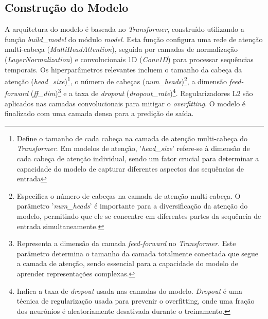 \subsection{Construção do Modelo}
A arquitetura do modelo é baseada no \textit{Transformer}, construído utilizando a função \textit{build\_model} do módulo \textit{model}. Esta função configura uma rede de atenção multi-cabeça (\textit{MultiHeadAttention}), seguida por camadas de normalização (\textit{LayerNormalization}) e convolucionais 1D (\textit{Conv1D}) para processar sequências temporais. Os hiperparâmetros relevantes incluem o tamanho da cabeça da atenção (\textit{head\_size})\footnote{Define o tamanho de cada cabeça na camada de atenção multi-cabeça do \textit{Transformer}. Em modelos de atenção, '\textit{head\_size}' refere-se à dimensão de cada cabeça de atenção individual, sendo um fator crucial para determinar a capacidade do modelo de capturar diferentes aspectos das sequências de entrada}, o número de cabeças (\textit{num\_heads})\footnote{Especifica o número de cabeças na camada de atenção multi-cabeça. O parâmetro '\textit{num\_heads}' é importante para a diversificação da atenção do modelo, permitindo que ele se concentre em diferentes partes da sequência de entrada simultaneamente.}, a dimensão \textit{feed-forward} (\textit{ff\_dim})\footnote{Representa a dimensão da camada \textit{feed-forward} no \textit{Transformer}. Este parâmetro determina o tamanho da camada totalmente conectada que segue a camada de atenção, sendo essencial para a capacidade do modelo de aprender representações complexas.} e a taxa de \textit{dropout} (\textit{dropout\_rate})\footnote{Indica a taxa de \textit{dropout} usada nas camadas do modelo. \textit{Dropout} é uma técnica de regularização usada para prevenir o overfitting, onde uma fração dos neurônios é aleatoriamente desativada durante o treinamento.}. Regularizadores L2 são aplicados nas camadas convolucionais para mitigar o \textit{overfitting}. O modelo é finalizado com uma camada densa para a predição de saída.

